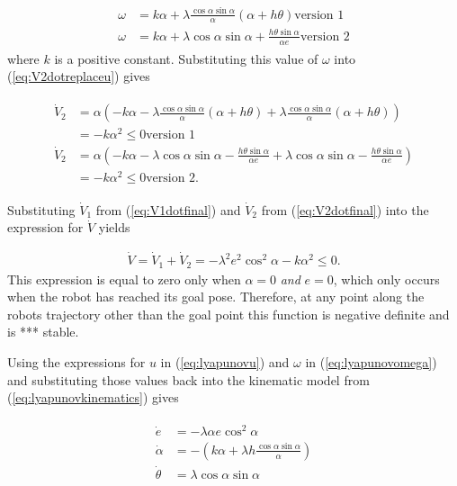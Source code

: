 \begin{align}
\label{eq:lyapunovomega}
\begin{split}
\omega &= k\alpha + \lambda\frac{\cos\alpha\sin\alpha}{\alpha}\left(\alpha+h\theta\right) \text{version 1} \\
\omega &= k\alpha + \lambda\cos\alpha\sin\alpha + \frac{h\theta\sin\alpha}{\alpha e} \text{version 2}
\end{split}
\end{align}
where $k$ is a positive constant. Substituting this value of $\omega$ into (\ref{eq:V2dotreplaceu}) gives

\begin{align}
\label{eq:V2dotfinal}
\begin{split}
\dot{V}_2 &= \alpha\left(-k\alpha-\lambda\frac{\cos\alpha\sin\alpha}{\alpha}(\alpha+h\theta) + \lambda\frac{\cos\alpha\sin\alpha}{\alpha}(\alpha+h\theta)\right) \\
&= -k\alpha^2 \leq 0 \text{version 1} \\
\dot{V}_2 &= \alpha\left(-k\alpha - \lambda\cos\alpha\sin\alpha - \frac{h\theta\sin\alpha}{\alpha e} + \lambda\cos\alpha\sin\alpha - \frac{h\theta\sin\alpha}{\alpha e}\right) \\
&= -k\alpha^2 \leq 0 \text{version 2}.
\end{split}
\end{align}

Substituting $\dot{V}_1$ from (\ref{eq:V1dotfinal}) and $\dot{V}_2$ from (\ref{eq:V2dotfinal}) into the expression for $\dot{V}$ yields

\begin{align}
\label{eq:Vfinal}
\dot{V} = \dot{V}_1 + \dot{V}_2 = -\lambda^2e^2\cos^2\alpha - k\alpha^2 \leq 0.
\end{align}
This expression is equal to zero only when $\alpha=0$ \textit{and} $e=0$, which only occurs when the robot has reached its goal pose. Therefore, at any point along the robots trajectory other than the goal point this function is negative definite and is *** stable.

Using the expressions for $u$ in (\ref{eq:lyapunovu}) and $\omega$ in (\ref{eq:lyapunovomega}) and substituting those values back into the kinematic model from (\ref{eq:lyapunovkinematics}) gives

\begin{align}
\label{eq:lyapunovfinalkinematics}
\begin{split}
\dot{e} &= -\lambda\alpha e\cos^2\alpha \\
\dot{\alpha} &= -\left(k\alpha + \lambda h\frac{\cos\alpha\sin\alpha}{\alpha}\right) \\
\dot{\theta} &= \lambda\cos\alpha\sin\alpha
\end{split}
\end{align}
